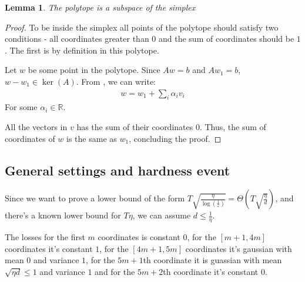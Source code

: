 \documentclass[10pt]{article}
\newtheorem{lemma}[theorem]{Lemma}
\theoremstyle{definition}
\theoremstyle{remark}
\renewcommand{\epsilon}{\varepsilon}
\newcommand{\rr}{\mathbb{R}}
\newcommand{\roundy}[1]{ {\left( #1 \right)}}
\begin{document}
\begin{lemma}
The polytope is a subspace of the simplex
\end{lemma}
\begin{proof}
To be inside the simplex all points of the polytope should satisfy two conditions - all coordinates greater than $0$ and the sum of coordinates should be $1$. The first is by definition in this polytope. 

Let $w$ be some point in the polytope. Since $Aw=b$ and $Aw_1=b$, $w-w_1\in \ker(A)$. From , we can write:
\begin{align*}
    w = w_1 + \sum_i\alpha_iv_i
\end{align*}
For some $\alpha_i\in\rr$.

All the vectors in $v$ has the sum of their coordinates $0$. Thus, the sum of coordinates of $w$ is the same as $w_1$, concluding the proof.
\end{proof}

\subsection{General settings and hardness event}
Since we want to prove a lower bound of the form $T\sqrt{\frac{\eta}{\log\roundy{\frac{1}{\epsilon}}}} = \Theta\roundy{T\sqrt{\frac{\eta}{d}}}$, and there's a known lower bound for $T\eta$, we can assume $d\le \frac{1}{\eta}$.

The losses for the first $m$ coordinates is constant $0$, for the $[m+1,4m]$ coordinates it's constant $1$, for the $[4m+1,5m]$ coordinates it's gaussian with mean $0$ and variance $1$, for the $5m+1$th coordinate it is guassian with mean $\sqrt{\eta d}\le 1$ and variance $1$ and for the $5m+2$th coordinate it's constant $0$.
\end{document}
